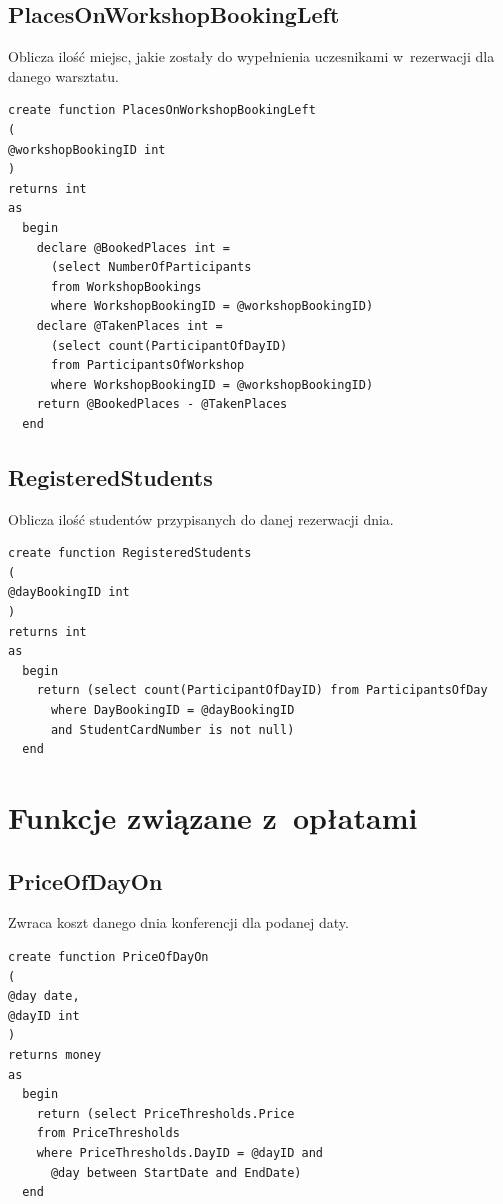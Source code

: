 \documentclass[12pt, a4paper]{mwrep}
\begin{document}
\subsection{PlacesOnWorkshopBookingLeft}

\noindent Oblicza ilość miejsc, jakie zostały do wypełnienia uczesnikami w~rezerwacji dla danego warsztatu.
\begin{lstlisting}
create function PlacesOnWorkshopBookingLeft
(
@workshopBookingID int
)
returns int
as
  begin
    declare @BookedPlaces int = 
      (select NumberOfParticipants 
      from WorkshopBookings 
      where WorkshopBookingID = @workshopBookingID)
    declare @TakenPlaces int = 
      (select count(ParticipantOfDayID) 
      from ParticipantsOfWorkshop 
      where WorkshopBookingID = @workshopBookingID)
    return @BookedPlaces - @TakenPlaces
  end
\end{lstlisting}

\subsection{RegisteredStudents}

\noindent Oblicza ilość studentów przypisanych do danej rezerwacji dnia.

\begin{lstlisting}
create function RegisteredStudents
(
@dayBookingID int
)
returns int
as
  begin
    return (select count(ParticipantOfDayID) from ParticipantsOfDay
      where DayBookingID = @dayBookingID
      and StudentCardNumber is not null)
  end
\end{lstlisting}

\section{Funkcje związane z~opłatami}

\subsection{PriceOfDayOn}

\noindent Zwraca koszt danego dnia konferencji dla podanej daty.

\begin{lstlisting}
create function PriceOfDayOn
(
@day date,
@dayID int
)
returns money
as
  begin
    return (select PriceThresholds.Price
    from PriceThresholds
    where PriceThresholds.DayID = @dayID and 
      @day between StartDate and EndDate)
  end
\end{lstlisting}
\end{document}
